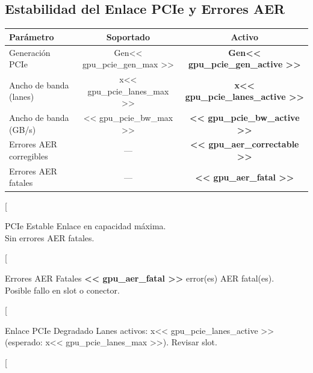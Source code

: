 \documentclass[11pt, a4paper, final]{article}
\newcommand{\mv}[1]{\textcolor{AMPrimary}{\textbf{#1}}}
\newcommand{\rowalt}{\rowcolor{AMLight}}
\newcommand{\thcell}[1]{\color{AMPrimary}\textbf{#1}}
\begin{document}
\vspace{0.5cm}


\subsection{Estabilidad del Enlace PCIe y Errores AER}

\begin{minipage}[t]{0.56\linewidth}
  \begin{tabularx}{\linewidth}{@{} X c c @{}}
    \toprule
    \thcell{Parámetro} & \thcell{Soportado} & \thcell{Activo} \\
    \midrule
    Generación PCIe        & Gen<< gpu_pcie_gen_max >>   & \mv{Gen<< gpu_pcie_gen_active >>} \\
    \rowalt
    Ancho de banda (lanes) & x<< gpu_pcie_lanes_max >>   & \mv{x<< gpu_pcie_lanes_active >>} \\
    Ancho de banda (GB/s)  & << gpu_pcie_bw_max >>       & \mv{<< gpu_pcie_bw_active >>} \\
    \rowalt
    Errores AER corregibles & ---                         & \mv{<< gpu_aer_correctable >>} \\
    Errores AER fatales     & ---                         & \mv{<< gpu_aer_fatal >>} \\
    \bottomrule
  \end{tabularx}
\end{minipage}
\hfill
\begin{minipage}[t]{0.41\linewidth}
  [%
  \begin{amboxok}{PCIe Estable}
    \scriptsize Enlace en capacidad máxima.\\
    Sin errores AER fatales.
  \end{amboxok}
  [%
  \begin{amboxcrit}{Errores AER Fatales}
    \scriptsize \mv{<< gpu_aer_fatal >>} error(es) AER fatal(es).\\
    Posible fallo en slot o conector.
  \end{amboxcrit}
  [%
  \begin{amboxwarn}{Enlace PCIe Degradado}
    \scriptsize Lanes activos: x<< gpu_pcie_lanes_active >>\\
    (esperado: x<< gpu_pcie_lanes_max >>). Revisar slot.
  \end{amboxwarn}
  [%
\end{minipage}
\end{document}
